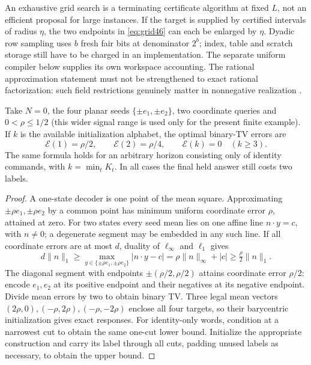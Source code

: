 An exhaustive grid search is a terminating certificate algorithm at
fixed $L$, not an efficient proposal for large instances. If the target
is supplied by certified intervals of radius $\eta$, the two endpoints
in \eqref{eq:grid46} can each be enlarged by $\eta$. Dyadic row sampling
uses $b$ fresh fair bits at denominator $2^b$; index, table and scratch
storage still have to be charged in an implementation. The separate
uniform compiler below supplies its own workspace accounting. The
rational approximation statement must not be strengthened to exact
rational factorization: such field restrictions genuinely matter in
nonnegative realization \cite{Shitov18}.

\begin{proposition}\label{prop:smallfront46}
Take $N=0$, the four planar seeds $\{\pm e_1,\pm e_2\}$, two coordinate
queries and $0<\rho\le1/2$ (this wider signal range is used only
for the present finite example). If $k$ is the available initialization
alphabet, the optimal binary-TV errors are
\begin{equation}\label{eq:smallfront46}
 \mathcal E(1)=\rho/2,\qquad
 \mathcal E(2)=\rho/4,\qquad
 \mathcal E(k)=0\quad(k\ge3).
\end{equation}
The same formula holds for an arbitrary horizon consisting only of
identity commands, with $k=\min_t K_t$. In all cases the final held
answer still costs two labels.
\end{proposition}
\begin{proof}
A one-state decoder is one point of the mean square. Approximating
$\pm\rho e_1,\pm\rho e_2$ by a common point has minimum uniform
coordinate error $\rho$, attained at zero. For two states every seed
mean lies on one affine line $n\cdot y=c$, with $n\ne0$; a degenerate
segment may be embedded in any such line. If all coordinate errors
are at most $d$, duality of $\ell_\infty$ and $\ell_1$ gives
\[
 d\|n\|_1\ge
 \max_{y\in\{\pm\rho e_1,\pm\rho e_2\}}|n\cdot y-c|
 =\rho\|n\|_\infty+|c|\ge\tfrac\rho2\|n\|_1.
\]
The diagonal segment with endpoints $\pm(\rho/2,\rho/2)$ attains
coordinate error $\rho/2$: encode $e_1,e_2$ at its positive endpoint
and their negatives at its negative endpoint. Divide mean errors by
two to obtain binary TV. Three legal mean vectors
$(2\rho,0),(-\rho,2\rho),(-\rho,-2\rho)$ enclose all four targets,
so their barycentric initialization gives exact responses.
For identity-only words, condition at a narrowest cut to obtain the
same one-cut lower bound. Initialize the appropriate construction and
carry its label through all cuts, padding unused labels as necessary,
to obtain the upper bound.
\end{proof}


